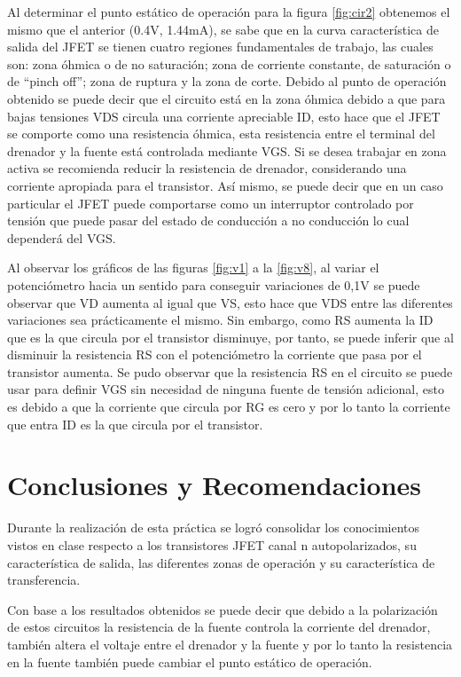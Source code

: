 \documentclass[12pt, a4paper]{article}
\begin{document}
    Al determinar el punto estático de operación para la figura \ref{fig:cir2} obtenemos el mismo que el anterior (0.4V, 1.44mA), se sabe que en la curva característica de salida del JFET se tienen cuatro regiones fundamentales de trabajo, las cuales son: zona óhmica o de no saturación; zona de corriente constante, de saturación o de “pinch off”; zona de ruptura y la zona de corte. Debido al punto de operación obtenido se puede decir que el circuito está en la zona óhmica debido a que para bajas tensiones VDS circula una corriente apreciable ID, esto hace que el JFET se comporte como una resistencia óhmica, esta resistencia entre el terminal del drenador y la fuente está controlada mediante VGS. Si se desea trabajar en zona activa se recomienda reducir la resistencia de drenador, considerando una corriente apropiada para el transistor. Así mismo, se puede decir que en un caso particular el JFET puede comportarse como un interruptor controlado por tensión que puede pasar del estado de conducción a no conducción lo cual dependerá del VGS.
    
    Al observar los gráficos de las figuras \ref{fig:v1} a la \ref{fig:v8}, al variar el potenciómetro hacia un sentido para conseguir variaciones de 0,1V se puede observar que VD aumenta al igual que VS, esto hace que VDS entre las diferentes variaciones sea prácticamente el mismo. Sin embargo, como RS aumenta la ID que es la que circula por el transistor disminuye, por tanto, se puede inferir que al disminuir la resistencia RS con el potenciómetro la corriente que pasa por el transistor aumenta. Se pudo observar que la resistencia RS en el circuito se puede usar para definir VGS sin necesidad de ninguna fuente de tensión adicional, esto es debido a que la corriente que circula por RG es cero y por lo tanto la corriente que entra ID es la que circula por el transistor.


    \newpage
    
    \section{Conclusiones y Recomendaciones}

    Durante la realización de esta práctica se logró consolidar los conocimientos vistos en clase respecto a los transistores JFET canal n autopolarizados, su característica de salida, las diferentes zonas de operación y su característica de transferencia. 

    Con base a los resultados obtenidos se puede decir que debido a la polarización de estos circuitos la resistencia de la fuente controla la corriente del drenador, también altera el voltaje entre el drenador y la fuente y por lo tanto la resistencia en la fuente también puede cambiar el punto estático de operación. 
\end{document}
